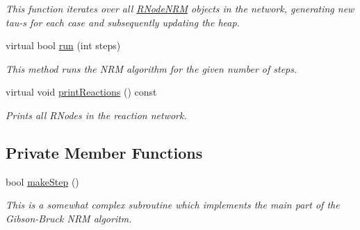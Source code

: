 \begin{DoxyCompactItemize}
\begin{DoxyCompactList}\small\item\em This function iterates over all \hyperlink{classRNodeNRM}{R\+Node\+N\+R\+M} objects in the network, generating new tau-\/s for each case and subsequently updating the heap. \end{DoxyCompactList}\item 
virtual bool \hyperlink{classChemNRMImpl_afe98b9ff5d172936cbacf683dcb16b9d}{run} (int steps)
\begin{DoxyCompactList}\small\item\em This method runs the N\+R\+M algorithm for the given number of steps. \end{DoxyCompactList}\item 
virtual void \hyperlink{classChemNRMImpl_aa0b3b3dad40946f941959f5fdc9ef625}{print\+Reactions} () const 
\begin{DoxyCompactList}\small\item\em Prints all R\+Nodes in the reaction network. \end{DoxyCompactList}\end{DoxyCompactItemize}
\subsection*{Private Member Functions}
\begin{DoxyCompactItemize}
\item 
bool \hyperlink{classChemNRMImpl_ac41e52dad38e3f90d54bac55c887c01f}{make\+Step} ()
\begin{DoxyCompactList}\small\item\em This is a somewhat complex subroutine which implements the main part of the Gibson-\/\+Bruck N\+R\+M algoritm. \end{DoxyCompactList}\end{DoxyCompactItemize}
